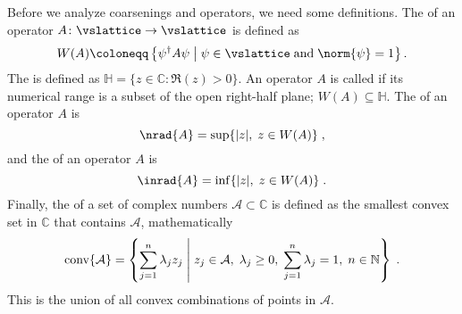 Before we analyze coarsenings and operators, we need some definitions.
The  of an operator $A \colon \vslattice \rightarrow \vslattice$ is defined as
\begin{align} \label{eq:def:numerical:range}
W(A) \coloneqq \left\{ \psi^\dagger A \psi \; \middle| \; \psi \in \vslattice \; \text{and} \; \norm{\psi} = 1 \right\}.
\end{align}
The  is defined as $\mathbb{H} = \{ z \in \mathbb{C} \colon \Re(z) > 0 \}$.
An operator $A$ is called  if its numerical range is a subset of the open right-half plane; $W(A) \subseteq \mathbb{H}$.
The  of an operator $A$ is
\begin{equation}
\nrad{A} =
\sup \{ \lvert z \rvert ,\; z \in W(A) \} \;,
\end{equation}
and the  of an operator $A$ is
\begin{equation}
\inrad{A} =
\inf \{ \lvert z \rvert ,\; z \in W(A) \} \;.
\end{equation}
Finally, the  of a set of complex numbers $\mathcal{A} \subset \mathbb{C}$ is defined as the smallest convex set in $\mathbb{C}$ that contains $\mathcal{A}$, mathematically
\begin{equation}
\text{conv}\{ \mathcal{A} \} = \left\{
    \sum_{j=1}^{n} \lambda_j z_j
    \; \middle| \;
    z_j \in \mathcal{A}, \;
    \lambda_j \geq 0, \;
    \sum_{j=1}^{n} \lambda_j = 1, \;
    n \in \mathbb{N}
\right\} \;.
\end{equation}
This is the union of all convex combinations of points in $\mathcal{A}$.

